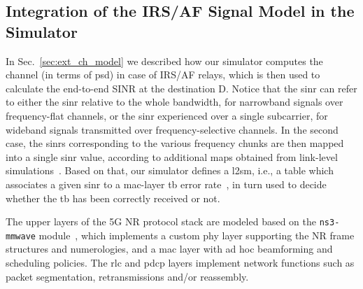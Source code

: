 \subsection{Integration of the IRS/AF Signal Model in the Simulator}
In Sec.~\ref{sec:ext_ch_model} we described how our simulator computes the channel (in terms of \gls{psd}) in case of IRS/AF relays, which is then used to calculate the end-to-end SINR at the destination D. 
Notice that the \gls{sinr} can refer to either the \gls{sinr} relative to the whole bandwidth, for narrowband signals over frequency-flat channels, or the \gls{sinr} experienced over a single subcarrier, for wideband signals transmitted over frequency-selective channels. 
In the second case, the \glspl{sinr} corresponding to the various frequency chunks are then mapped into a single \gls{sinr} value, according to additional maps obtained from link-level simulations~\cite{lagen2020new}.
Based on that, our simulator defines a \gls{l2sm}, i.e., a table which associates a given \gls{sinr} to a \gls{mac}-layer \gls{tb} error rate~\cite{mezzavilla2012lightweight}, in turn used to  decide whether the \gls{tb} has been correctly received or not.

The upper layers of the 5G NR protocol stack are modeled based on the \texttt{ns3-mmwave} module~\cite{mezzavilla2018end}, which implements a custom \gls{phy} layer supporting the NR frame structures and numerologies, and a \gls{mac} layer with ad hoc beamforming and scheduling policies. 
The \gls{rlc} and \gls{pdcp} layers implement network functions such as packet segmentation, retransmissions and/or reassembly. 






